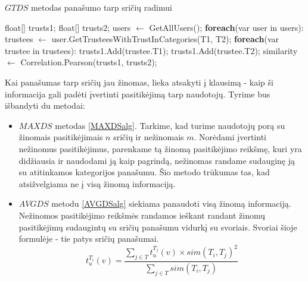 \documentclass{VUMIFInfMagistrinis}
\begin{document}
\begin{algorithm}
	\caption{$GTDS$ metodas panašumo tarp sričių radimui}\label{catsimalg}
	\begin{algorithmic}[1]
		\State float[] trusts1;
		\State float[] trusts2;
		\State users $\gets$ GetAllUsers();
		\State \textbf{foreach}(var user in users):
		\State \indent trustees $\gets$ user.GetTrusteesWithTrustInCategories(T1, T2);
		\State \indent \textbf{foreach}(var trustee in trustees):
		\State \indent \indent trusts1.Add(trustee.T1);
		\State \indent \indent trusts1.Add(trustee.T2);
		\State similarity $\gets$ Correlation.Pearson(trusts1, trusts2);
		\EndProcedure
	\end{algorithmic}
\end{algorithm}

\indent 
Kai panašumas tarp sričių jau žinomas, lieka atsakyti į klausimą - kaip ši informacija gali padėti įvertinti pasitikėjimą tarp naudotojų. Tyrime bus išbandyti du metodai:
\begin{itemize}
	\item $MAXDS$ metodas \ref{MAXDSalg}. Tarkime, kad turime naudotojų porą su žinomais pasitikėjimais $n$ sričių ir nežinomais $m$. Norėdami įvertinti nežinomus pasitikėjimus, parenkame tą žinomą pasitikėjimo reikšmę, kuri yra didžiausia ir naudodami ją kaip pagrindą, nežinomas randame sudauginę ją su atitinkamos kategorijos panašumu. Šio metodo trūkumas tas, kad atsižvelgiama ne į visą žinomą informaciją. 
	\item $AVGDS$ metodu \ref{AVGDSalg} siekiama panaudoti visą žinomą informaciją. Nežinomos pasitikėjimo reikšmės randamos ieškant randant žinomų pasitikėjimų sudaugintų su sričių panašumu vidurkį su svoriais. Svoriai šioje formulėje - tie patys sričių panašumai.
	\begin{equation}
	t_u^{T_i}(v) = \frac{\sum\limits_{j \in T } t_u^{T_j}(v) \times sim(T_i, T_j)^2}{\sum\limits_{j \in T} sim(T_i, T_j)}
	\end{equation}
\end{itemize}
\end{document}
